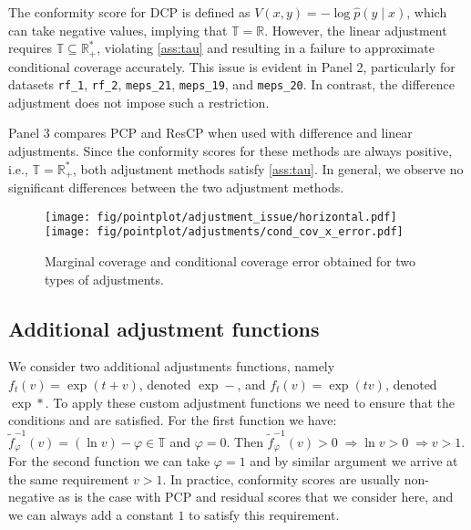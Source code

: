   The conformity score for DCP is defined as \( V(x, y) = -\log \hat{p}(y \mid x) \), which can take negative values, implying that \( \mathbb{T} = \mathbb{R} \). However, the linear adjustment requires \( \mathbb{T} \subseteq \mathbb{R}_+^* \), violating \cref{ass:tau} and resulting in a failure to approximate conditional coverage accurately. This issue is evident in Panel 2, particularly for datasets \texttt{rf\_1}, \texttt{rf\_2}, \texttt{meps\_21}, \texttt{meps\_19}, and \texttt{meps\_20}. In contrast, the difference adjustment does not impose such a restriction.

  Panel 3 compares PCP and ResCP when used with difference and linear adjustments. Since the conformity scores for these methods are always positive, i.e., \( \mathbb{T} = \mathbb{R}^*_+ \), both adjustment methods satisfy \cref{ass:tau}. In general, we observe no significant differences between the two adjustment methods.

  \begin{figure}[H]
    \centering
    \texttt{[image: fig/pointplot/adjustment\_issue/horizontal.pdf]}
    \texttt{[image: fig/pointplot/adjustments/cond\_cov\_x\_error.pdf]}
    \caption{Marginal coverage and conditional coverage error obtained for two types of adjustments.}
    \label{fig:pointplot/adjustment_issue/horizontal}
  \end{figure}

\newpage
\subsection{Additional adjustment functions}
\label{sec:additional_adjustment}
  We consider two additional adjustments functions, namely $f_t(v) = \exp{(t + v)}$, denoted $\exp -$, and $f_t(v) = \exp{(t v)}$, denoted $\exp *$. To apply these custom adjustment functions we need to ensure that the conditions  and  are satisfied.
  For the first function we have: $\tilde{f}_{\varphi}^{-1}(v) = (\ln v) - \varphi \in \mathbb{T}$ and $\varphi = 0$. Then $\tilde{f}_{\varphi}^{-1}(v) > 0 \; \Rightarrow \ln v > 0 \; \Rightarrow v > 1$. For the second function we can take $\varphi = 1$ and by similar argument we arrive at the same requirement $v > 1$. In practice, conformity scores are usually
   non-negative as is the case with PCP and residual scores that we consider here, and we can always add a constant $1$ to satisfy this requirement.
  
